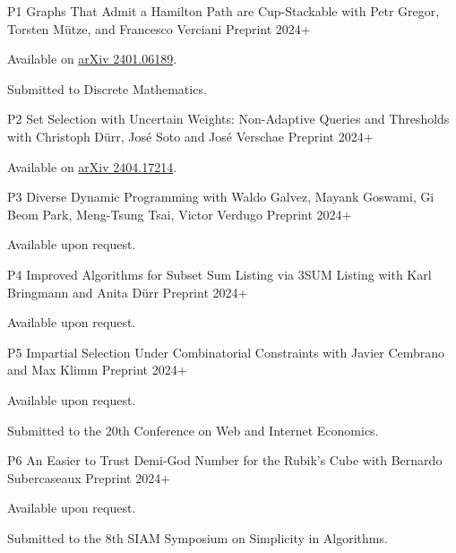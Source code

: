 \begin{cvpublications}

\cvpublication
  {P1} %
  {Graphs That Admit a Hamilton Path are Cup-Stackable} %
  {with Petr Gregor, Torsten Mütze, and Francesco Verciani} %
  {Preprint} %
  {2024+}
  {
  \begin{cvitems} %
    \item Available on \hyperlink{https://arxiv.org/abs/2401.06189}{arXiv 2401.06189}.
    \item Submitted to Discrete Mathematics.
  \end{cvitems}
  }
  

\cvpublication
{P2} %
{Set Selection with Uncertain Weights: Non-Adaptive Queries and Thresholds} %
{with Christoph Dürr, José Soto and José Verschae} %
{Preprint} %
{2024+}
{
\begin{cvitems} %
  \item Available on \hyperlink{https://arxiv.org/abs/2404.17214}{arXiv 2404.17214}.
\end{cvitems}
}




\cvpublication
{P3} %
{Diverse Dynamic Programming} %
{with Waldo Galvez, Mayank Goswami, Gi Beom Park, Meng-Tsung Tsai, Victor Verdugo} %
{Preprint} %
{2024+}
{
\begin{cvitems} %
  \item Available upon request.
\end{cvitems}
}


\cvpublication
{P4} %
{Improved Algorithms for Subset Sum Listing via 3SUM Listing} %
{with Karl Bringmann and Anita Dürr} %
{Preprint} %
{2024+}
{
\begin{cvitems} %
  \item Available upon request.
\end{cvitems}
}



\cvpublication
{P5} %
{Impartial Selection Under Combinatorial Constraints} %
{with Javier Cembrano and Max Klimm} %
{Preprint} %
{2024+}
{
\begin{cvitems} %
  \item Available upon request.
  \item Submitted to the 20th Conference on Web and Internet Economics.
\end{cvitems}
}

\cvpublication
{P6} %
{An Easier to Trust Demi-God Number for the Rubik’s Cube} %
{with Bernardo Subercaseaux} %
{Preprint} %
{2024+}
{
\begin{cvitems} %
  \item Available upon request.
  \item Submitted to the 8th SIAM Symposium on Simplicity in Algorithms.
\end{cvitems}
}
\end{cvpublications}
